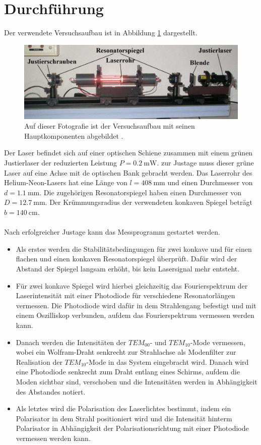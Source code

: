 \section{Durchführung}
\label{sec:Durchführung}

Der verwendete Versuchsaufbau ist in Abbildung \ref{abb4} dargestellt.
\begin{figure}
    \centering
    \includegraphics[width=\textwidth]{figure/Aufbau.pdf}
    \caption{Auf dieser Fotografie ist der Versuchsaufbau mit seinen 
    Hauptkomponenten abgebildet \cite{sample}.}
    \label{abb4}
\end{figure}
Der Laser befindet sich auf einer optischen Schiene zusammen mit einem grünen
Justierlaser der reduzierten Leistung $P = \SI{0,2}{\milli\watt}$.
zur Justage muss dieser grüne Laser auf eine Achse mit de optischen Bank 
gebracht werden. 
Das Laserrohr des Helium-Neon-Lasers hat eine Länge von $l = \SI{408}{\milli\meter}$
und einen Durchmesser von $d = \SI{1,1}{\milli\meter}$. Die zugehörigen 
Resonatorspiegel haben einen Durchmesser von $D = \SI{12,7}{\milli\meter}$.
Der Krümmungsradius der verwendeten konkaven Spiegel beträgt $b = \SI{140}{\centi\meter}$.
\\\\
Nach erfolgreicher Justage kann das Messprogramm gestartet werden. 
\begin{itemize}
    \item Als erstes werden die Stabilitätsbedingungen für zwei konkave und für einen 
    flachen und einen konkaven Resonatorspiegel überprüft. Dafür wird der Abstand der 
    Spiegel langsam erhöht, bis kein Lasersignal mehr entsteht.
    \item Für zwei konkave Spiegel wird hierbei gleichzeitig 
    das Fourierspektrum der Laserintensität mit einer Photodiode 
    für verschiedene Resonatorlängen vermessen.
    Die Photodiode wird dafür in dem Strahlengang befestigt und mit einem Oszilliskop
    verbunden, aufdem das Fourierspektrum vermessen werden kann. 
    \item Danach werden die Intensitäten der $TEM_{\text{00}}$- und $TEM_{\text{10}}$-Mode
    vermessen, wobei ein Wolfram-Draht senkrecht zur Strahlachse als Modenfilter zur 
    Realisation der $TEM_{\text{10}}$-Mode in das System eingebracht wird.
    Danach wird eine Photodiode senkrecht zum Draht entlang eines Schirms, aufdem die 
    Moden sichtbar sind, verschoben und 
    die Intensitäten werden in Abhängigkeit des Abstandes notiert.
    \item Als letztes wird die Polarisation des Laserlichtes bestimmt, indem ein 
    Polarisator in dem Strahl positioniert wird und die Intensität hinterm 
    Polarisator in Abhängigkeit der Polarisationsrichtung mit einer Photodiode vermessen 
    werden kann. 
\end{itemize}
\newpage